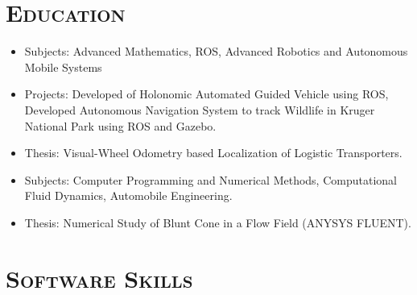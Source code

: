 \documentclass[11pt,a4paper,roman]{moderncv} %
\begin{document}

\section{\scshape{Education}}

{
\begin{itemize}
\item Subjects:  Advanced Mathematics, ROS, Advanced Robotics and Autonomous Mobile Systems
\item Projects: Developed of Holonomic Automated Guided Vehicle using ROS, Developed Autonomous Navigation System to track Wildlife in Kruger National Park using ROS and Gazebo.
\item Thesis: Visual-Wheel Odometry based Localization of Logistic Transporters.
\newline{}
\end{itemize}
}

{
\begin{itemize}
\item Subjects: Computer Programming and Numerical Methods, Computational Fluid Dynamics, Automobile Engineering.
\item Thesis: Numerical Study of Blunt Cone in a Flow Field (ANYSYS FLUENT).
\end{itemize}
}

\newpage

\section{\scshape{Software Skills}}

\end{document}
